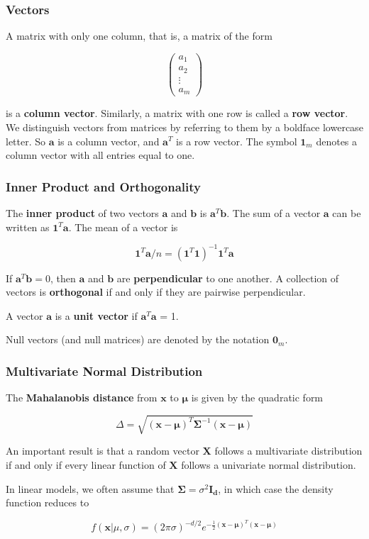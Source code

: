 \documentclass{beamer}
\begin{document}
\begin{frame}
\frametitle{Vectors}
A matrix with only one column, that is, a matrix of the form

\[\begin{pmatrix}
    a_1\\
    a_2\\
    \vdots  \\
    a_m
\end{pmatrix}
\]

is a \textbf{column vector}.  Similarly, a matrix with one row is called a \textbf{row vector}.  We distinguish vectors from matrices by referring to them by a boldface lowercase letter.  So $\mathbf{a}$ is a column vector, and $\mathbf{a}^T$ is a row vector.  The symbol $\mathbf{1}_m$ denotes a column vector with all entries equal to one.\\
\end{frame}

\begin{frame}
\frametitle{Inner Product and Orthogonality}
The \textbf{inner product} of two vectors $\mathbf{a}$ and $\mathbf{b}$ is $\mathbf{a}^T\mathbf{b}$.  The sum of a vector $\mathbf{a}$ can be written as $\mathbf{1}^T\mathbf{a}$.  The mean of a vector is

\[\mathbf{1}^T\mathbf{a}/n = (\mathbf{1}^T\mathbf{1})^{-1}\mathbf{1}^T\mathbf{a}\]

If $\mathbf{a}^T\mathbf{b} = 0$, then $\mathbf{a}$ and $\mathbf{b}$ are \textbf{perpendicular} to one another.  A collection of vectors is \textbf{orthogonal} if and only if they are pairwise perpendicular.
\vspace{5mm}

A vector $\mathbf{a}$ is a \textbf{unit vector} if $\mathbf{a}^T\mathbf{a}$ = 1.
\vspace{5mm}

Null vectors (and null matrices) are denoted by the notation $\mathbf{0}_m$.
\end{frame}


\begin{frame}
\frametitle{Multivariate Normal Distribution}
The \textbf{Mahalanobis distance} from $\mathbf{x}$ to $\mathbf{\mu}$ is given by the quadratic form

$$\Delta = \sqrt{(\mathbf{x} - \mathbf{\mu})^T \mathbf{\Sigma}^{-1}(\mathbf{x} - \mathbf{\mu})}$$

An important result is that a random vector $\mathbf{X}$ follows a multivariate distribution if and only if every linear function of $\mathbf{X}$ follows a univariate normal distribution.
\vspace{5mm}

In linear models, we often assume that $\mathbf{\Sigma} = \sigma^2\mathbf{I_d}$, in which case the density function reduces to

$$f(\mathbf{x}|\mu, \sigma) = (2\pi \sigma)^{-d/2} e^{-\frac{1}{2} (\mathbf{x} - \mathbf{\mu})^T (\mathbf{x} - \mathbf{\mu})}$$
\end{frame}
\end{document}
